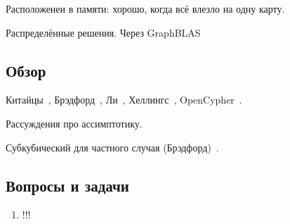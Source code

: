 Расположенеи в памяти: хорошо, когда всё влезло на одну карту.

Распределённые решения. 
Через GraphBLAS

\subsection{Обзор}

Китайцы~\cite{!!!}, Брэдфорд~\cite{!!!}, Ли~\cite{!!!}, Хеллингс~\cite{!!!}, OpenCypher~\cite{Kuijpers:2019:ESC:3335783.3335791}.


Рассуждения про ассимптотику.

Субкубический для частного случая (Брэдфорд)~\cite{8249039}.

\subsection{Вопросы и задачи}
\begin{enumerate}
  \item !!!
\end{enumerate}
